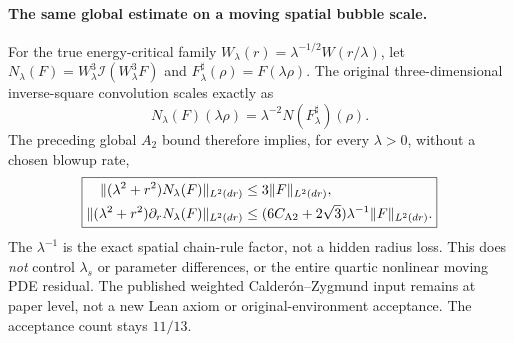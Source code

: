 \documentclass[11pt]{amsart}
\begin{document}
\paragraph{The same global estimate on a moving spatial bubble scale.}
For the true energy-critical family
\(W_\lambda(r)=\lambda^{-1/2}W(r/\lambda)\),
let \(N_\lambda(F)=W_\lambda^3
\mathcal I(W_\lambda^3F)\) and
\(F_\lambda^\sharp(\rho)=F(\lambda\rho)\).
The original three-dimensional inverse-square
convolution scales exactly as
\[
 N_\lambda(F)(\lambda\rho)
    =\lambda^{-2}N(F^\sharp_\lambda)(\rho).
\]
The preceding global \(A_2\) bound therefore implies,
for every \(\lambda>0\), without a chosen blowup rate,
\[
 \boxed{\begin{aligned}
 \|(\lambda^2+r^2)N_\lambda(F)\|_{L^2(dr)}
   &\le3\|F\|_{L^2(dr)},\\
 \|(\lambda^2+r^2)\partial_rN_\lambda(F)\|_{L^2(dr)}
   &\le (6C_{\rm A2}+2\sqrt3)\lambda^{-1}
          \|F\|_{L^2(dr)} .
 \end{aligned}}
\]
The \(\lambda^{-1}\) is the exact spatial chain-rule
factor, not a hidden radius loss.
This does \emph{not} control \(\lambda_s\) or
parameter differences, or the entire quartic
nonlinear moving PDE residual.
The published weighted Calder\'on--Zygmund input
remains at paper level, not a new Lean axiom or
original-environment acceptance.
The acceptance count stays \(11/13\).
\end{document}
